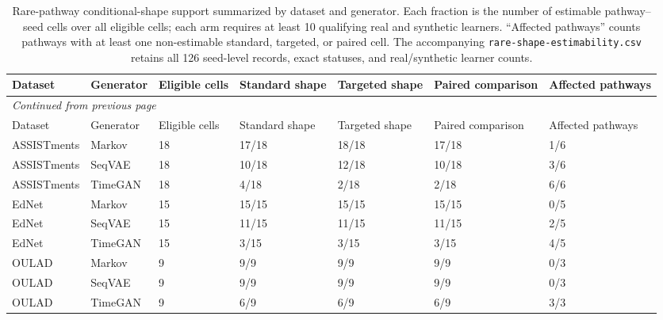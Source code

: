 \scriptsize
\setlength{\tabcolsep}{5pt}
\begin{longtable}{@{}p{2.3cm}p{1.8cm}p{2.7cm}p{3.0cm}p{3.0cm}p{3.1cm}p{3.3cm}@{}}
\caption{Rare-pathway conditional-shape support summarized by dataset and generator. Each fraction is the number of estimable pathway--seed cells over all eligible cells; each arm requires at least 10 qualifying real and synthetic learners. ``Affected pathways'' counts pathways with at least one non-estimable standard, targeted, or paired cell. The accompanying \texttt{rare-shape-estimability.csv} retains all 126 seed-level records, exact statuses, and real/synthetic learner counts.}\label{tab:supp-shape-statuses}\\
\toprule
Dataset & Generator & Eligible cells & Standard shape & Targeted shape & Paired comparison & Affected pathways \\
\midrule
\endfirsthead
\multicolumn{7}{l}{\textit{Continued from previous page}}\\
\toprule
Dataset & Generator & Eligible cells & Standard shape & Targeted shape & Paired comparison & Affected pathways \\
\midrule
\endhead
\bottomrule
\endlastfoot
ASSISTments & Markov & 18 & 17/18 & 18/18 & 17/18 & 1/6 \\
ASSISTments & SeqVAE & 18 & 10/18 & 12/18 & 10/18 & 3/6 \\
ASSISTments & TimeGAN & 18 & 4/18 & 2/18 & 2/18 & 6/6 \\
EdNet & Markov & 15 & 15/15 & 15/15 & 15/15 & 0/5 \\
EdNet & SeqVAE & 15 & 11/15 & 11/15 & 11/15 & 2/5 \\
EdNet & TimeGAN & 15 & 3/15 & 3/15 & 3/15 & 4/5 \\
OULAD & Markov & 9 & 9/9 & 9/9 & 9/9 & 0/3 \\
OULAD & SeqVAE & 9 & 9/9 & 9/9 & 9/9 & 0/3 \\
OULAD & TimeGAN & 9 & 6/9 & 6/9 & 6/9 & 3/3 \\
\end{longtable}
